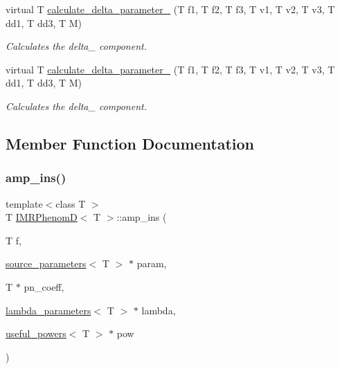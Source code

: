 \begin{DoxyCompactItemize}
virtual T \hyperlink{classIMRPhenomD_a4201abf06608c7a11adfee232f7eb581}{calculate\+\_\+delta\+\_\+parameter\+\_} (T f1, T f2, T f3, T v1, T v2, T v3, T dd1, T dd3, T M)
\begin{DoxyCompactList}\small\item\em Calculates the delta\+\_ component. \end{DoxyCompactList}\item 
virtual T \hyperlink{classIMRPhenomD_a22f9b0bc83c4ed555a46b03260c0d91d}{calculate\+\_\+delta\+\_\+parameter\+\_} (T f1, T f2, T f3, T v1, T v2, T v3, T dd1, T dd3, T M)
\begin{DoxyCompactList}\small\item\em Calculates the delta\+\_ component. \end{DoxyCompactList}\end{DoxyCompactItemize}


\subsection{Member Function Documentation}
\mbox{\label{classIMRPhenomD_aef404dca66beb6652663271fee31b8f8}} 
\subsubsection{\texorpdfstring{amp\+\_\+ins()}{amp\_ins()}}
{\footnotesize\ttfamily template$<$class T $>$ \\
T \hyperlink{classIMRPhenomD}{I\+M\+R\+PhenomD}$<$ T $>$\+::amp\+\_\+ins (\begin{DoxyParamCaption}\item[{T}]{f,  }\item[{\hyperlink{structsource__parameters}{source\+\_\+parameters}$<$ T $>$ $\ast$}]{param,  }\item[{T $\ast$}]{pn\+\_\+coeff,  }\item[{\hyperlink{structlambda__parameters}{lambda\+\_\+parameters}$<$ T $>$ $\ast$}]{lambda,  }\item[{\hyperlink{structuseful__powers}{useful\+\_\+powers}$<$ T $>$ $\ast$}]{pow }\end{DoxyParamCaption})\hspace{0.3cm}{\ttfamily [virtual]}}




